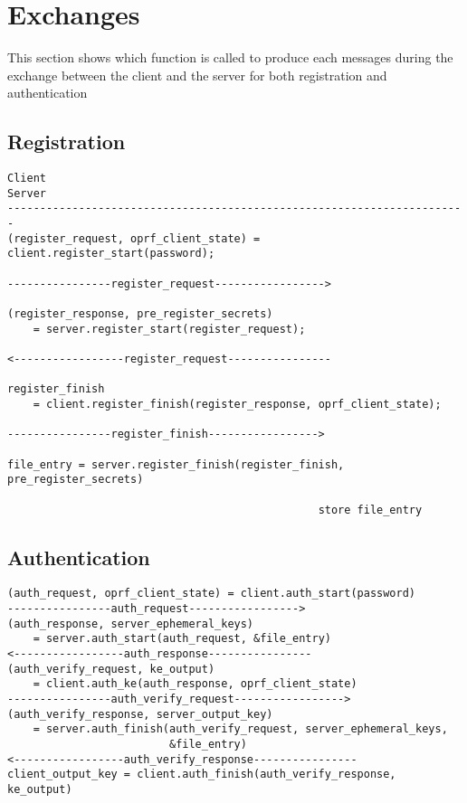 \documentclass[../report.tex]{subfiles}
\begin{document}
\section{Exchanges}

This section shows which function is called to produce each messages during the exchange between the client and the server for both registration and authentication

\subsection{Registration}
\begin{verbatim}
Client                                                           Server
-----------------------------------------------------------------------
(register_request, oprf_client_state) = client.register_start(password);

----------------register_request----------------->

(register_response, pre_register_secrets) 
    = server.register_start(register_request);

<-----------------register_request----------------

register_finish
    = client.register_finish(register_response, oprf_client_state);

----------------register_finish----------------->

file_entry = server.register_finish(register_finish, pre_register_secrets)

                                                store file_entry
\end{verbatim}
\subsection{Authentication}
\begin{verbatim}
(auth_request, oprf_client_state) = client.auth_start(password)
----------------auth_request----------------->
(auth_response, server_ephemeral_keys) 
    = server.auth_start(auth_request, &file_entry)
<-----------------auth_response----------------
(auth_verify_request, ke_output) 
    = client.auth_ke(auth_response, oprf_client_state)
----------------auth_verify_request----------------->
(auth_verify_response, server_output_key) 
    = server.auth_finish(auth_verify_request, server_ephemeral_keys,
                         &file_entry)
<-----------------auth_verify_response----------------
client_output_key = client.auth_finish(auth_verify_response, ke_output)
\end{verbatim}
\end{document}
